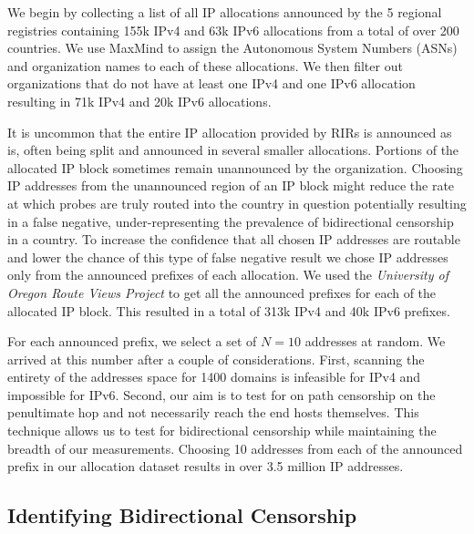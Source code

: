 We begin by collecting a list of all IP allocations announced by the 5 regional
registries \cite{herrbisc56:online} containing 155k IPv4 and
63k IPv6 allocations from a total of over 200 countries. We use
MaxMind \cite{IPGeoloc87:online} to assign the Autonomous System Numbers (ASNs)
and organization names to each of these allocations. We then filter out
organizations that do not have at least one IPv4 and one IPv6 allocation
resulting in 71k IPv4 and 20k IPv6 allocations.

It is uncommon that the entire IP allocation provided by RIRs is announced as
is, often being split and announced in several smaller allocations. Portions of
the allocated IP block sometimes remain unannounced by the organization.
Choosing IP addresses from the unannounced region of an IP block might reduce
the rate at which probes are truly routed into the country in question
potentially resulting in a false negative, under-representing the prevalence of
bidirectional censorship in a country. To increase the confidence that all
chosen IP addresses are routable and lower the chance of this type of false
negative result we chose IP addresses only from the announced prefixes of each
allocation. We used the \textit{University of Oregon Route Views Project}
\cite{RouteVie20:online} to get all the announced prefixes for each of the
allocated IP block. This resulted in a total of 313k IPv4 and 40k IPv6 prefixes.

For each announced prefix, we select a set of $N=10$ addresses at random. We
arrived at this number after a couple of considerations. First, scanning the
entirety of the addresses space for 1400 domains is infeasible for IPv4 and
impossible for IPv6. Second, our aim is to test for on path censorship on the
penultimate hop and not necessarily reach the end hosts themselves. This
technique allows us to test for bidirectional censorship while maintaining the
breadth of our measurements. Choosing 10 addresses from each of the announced
prefix in our allocation dataset results in over 3.5 million IP addresses.

\subsection{Identifying Bidirectional Censorship}
\label{sec:methodology:censorship}

